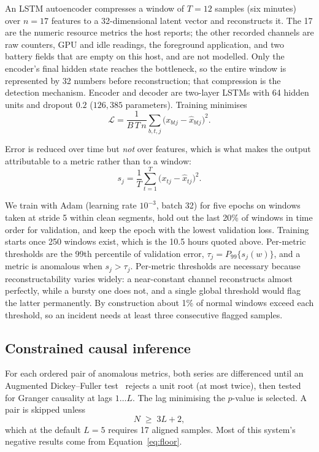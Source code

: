\documentclass[conference]{IEEEtran}
\begin{document}
An LSTM autoencoder compresses a window of $T=12$ samples (six minutes) over
$n=17$ features to a 32-dimensional latent vector and reconstructs it. The 17
are the numeric resource metrics the host reports; the other recorded
channels are raw counters, GPU and idle readings, the foreground application,
and two battery fields that are empty on this host, and are not modelled. Only the encoder's final
hidden state reaches the bottleneck, so the entire window is represented by 32
numbers before reconstruction; that compression is the detection mechanism.
Encoder and decoder are two-layer LSTMs with 64 hidden units and dropout
$0.2$ ($126{,}385$ parameters). Training minimises
\begin{equation}
\mathcal{L} = \frac{1}{B\,T\,n}\sum_{b,t,j}\bigl(x_{btj}-\hat{x}_{btj}\bigr)^2 .
\end{equation}

Error is reduced over time but \emph{not} over features, which is what makes
the output attributable to a metric rather than to a window:
\begin{equation}
s_j = \frac{1}{T}\sum_{t=1}^{T}\bigl(x_{tj}-\hat{x}_{tj}\bigr)^2 .
\end{equation}

We train with Adam (learning rate $10^{-3}$, batch 32) for five epochs on
windows taken at stride 5 within clean segments, hold out the last 20\% of
windows in time order for validation, and keep the epoch with the lowest
validation loss. Training starts once 250 windows exist, which is the
10.5 hours quoted above. Per-metric thresholds are the 99th percentile of
validation error,
$\tau_j = P_{99}\{s_j(w)\}$, and a metric is anomalous when $s_j > \tau_j$.
Per-metric thresholds are necessary because reconstructability varies widely:
a near-constant channel reconstructs almost perfectly, while a bursty one does
not, and a single global threshold would flag the latter permanently. By
construction about 1\% of normal windows exceed each threshold, so an
incident needs at least three consecutive flagged samples.

\subsection{Constrained causal inference}

For each ordered pair of anomalous metrics, both series are differenced until
an Augmented Dickey--Fuller test~\cite{dickey1979distribution} rejects a unit
root (at most twice), then
tested for Granger causality at lags $1\ldots L$. The lag minimising the
$p$-value is selected. A pair is skipped unless
\begin{equation}
N \;\ge\; 3L + 2 ,
\label{eq:floor}
\end{equation}
which at the default $L=5$ requires 17 aligned samples. Most of this
system's negative results come from Equation~\eqref{eq:floor}.
\end{document}
